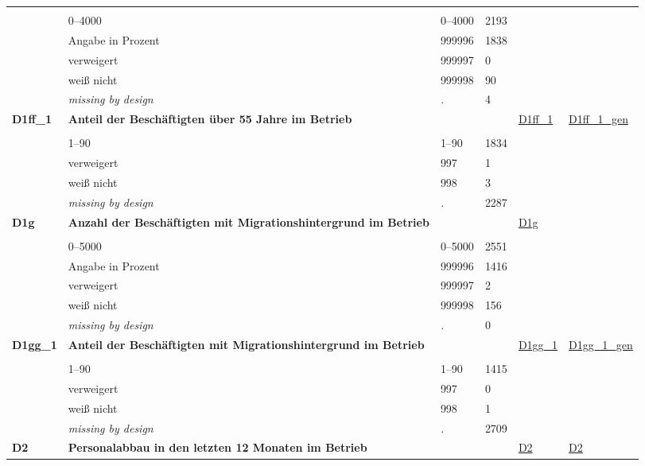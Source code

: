 \begin{longtable}{| L{2.45cm} | L{6cm} | C{1.5cm} | R{1cm} | C{2.25cm} | C{2.25cm} |}
   &  &  &  &  &  \\ 
   & 0--4000 & 0--4000 & 2193 &  &  \\ 
   & Angabe in Prozent & 999996 & 1838 &  &  \\ 
   & verweigert & 999997 & 0 &  &  \\ 
   & weiß nicht & 999998 & 90 &  &  \\ 
   & \textit{missing by design} & \textit{.} & 4 &  &  \\ 
   \midrule
\textbf{D1ff\_1}\label{var:D1ff:1} & \textbf{Anteil der Beschäftigten über 55 Jahre im Betrieb} &  &  & \hyperref[D1ff:1]{D1ff\_1} & \hyperref[var:suf:D1ff:1:gen]{D1ff\_1\_gen} \\ 
   &  &  &  &  &  \\ 
   & 1--90 & 1--90 & 1834 &  &  \\ 
   & verweigert & 997 & 1 &  &  \\ 
   & weiß nicht & 998 & 3 &  &  \\ 
   & \textit{missing by design} & \textit{.} & 2287 &  &  \\ 
   \midrule
\textbf{D1g}\label{var:D1g} & \textbf{Anzahl der Beschäftigten mit Migrationshintergrund im Betrieb} &  &  & \hyperref[D1g]{D1g} & \hyperref[var:suf:]{} \\ 
   &  &  &  &  &  \\ 
   & 0--5000 & 0--5000 & 2551 &  &  \\ 
   & Angabe in Prozent & 999996 & 1416 &  &  \\ 
   & verweigert & 999997 & 2 &  &  \\ 
   & weiß nicht & 999998 & 156 &  &  \\ 
   & \textit{missing by design} & \textit{.} & 0 &  &  \\ 
   \midrule
\textbf{D1gg\_1}\label{var:D1gg:1} & \textbf{Anteil der Beschäftigten mit Migrationshintergrund im Betrieb} &  &  & \hyperref[D1gg:1]{D1gg\_1} & \hyperref[var:suf:D1gg:1:gen]{D1gg\_1\_gen} \\ 
   &  &  &  &  &  \\ 
   & 1--90 & 1--90 & 1415 &  &  \\ 
   & verweigert & 997 & 0 &  &  \\ 
   & weiß nicht & 998 & 1 &  &  \\ 
   & \textit{missing by design} & \textit{.} & 2709 &  &  \\ 
   \midrule
\textbf{D2}\label{var:D2} & \textbf{Personalabbau in den letzten 12 Monaten im Betrieb} &  &  & \hyperref[D2]{D2} & \hyperref[var:suf:D2]{D2} \\ 

\end{longtable}
